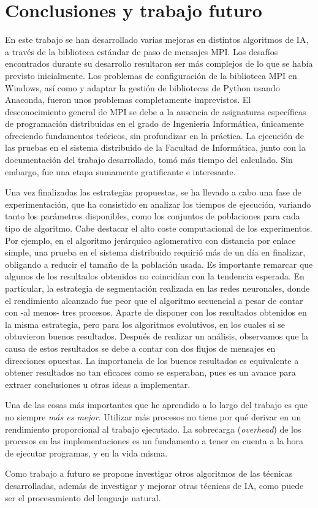 \chapter{Conclusiones y trabajo futuro}
\label{cap:c5_conclu}

	En este trabajo se han desarrollado varias mejoras en distintos algoritmos de IA, a través de la biblioteca estándar de paso de mensajes MPI. Los desafíos encontrados durante su desarrollo resultaron ser más complejos de lo que se había previsto inicialmente. Los problemas de configuración de la biblioteca MPI en Windows, así como y adaptar la gestión de bibliotecas de Python usando Anaconda, fueron unos problemas completamente imprevistos. El desconocimiento general de  MPI se debe a la ausencia de asignaturas específicas de programación distribuidas en el grado de Ingeniería Informática, únicamente ofreciendo fundamentos teóricos, sin profundizar en la práctica. La ejecución de las pruebas en el sistema distribuido de la Facultad de Informática, junto con la documentación del trabajo desarrollado, tomó más tiempo del calculado. Sin embargo, fue una etapa sumamente gratificante e interesante. 
	
		
	Una vez finalizadas las estrategias propuestas, se ha llevado a cabo una fase de experimentación, que ha consistido en analizar los tiempos de ejecución, variando tanto los parámetros disponibles, como los conjuntos de poblaciones para cada tipo de algoritmo. Cabe destacar el alto coste computacional de los experimentos. Por ejemplo, en el algoritmo jerárquico aglomerativo con distancia por enlace simple, una prueba en el sistema  distribuido requirió más de un día en finalizar, obligando a reducir el tamaño de la población usada. Es importante remarcar que algunos de los resultados obtenidos no coincidían con la tendencia esperada. En particular, la estrategia de segmentación realizada en las redes neuronales, donde el rendimiento alcanzado fue peor que el algoritmo secuencial a pesar de contar con -al menos- tres procesos. Aparte de disponer con los resultados obtenidos en la misma estrategia, pero para los algoritmos evolutivos, en los cuales si se obtuvieron buenos resultados. Después de realizar un análisis, observamos que la causa de estos resultados se debe a contar con dos flujos de mensajes en direcciones opuestas. La importancia de los buenos resultados es equivalente a obtener resultados no tan eficaces como se esperaban, pues es un avance para extraer conclusiones u otras ideas a implementar.
	

	Una de las cosas más importantes que he aprendido a lo largo del trabajo es que no siempre \textit{más es mejor}. Utilizar más procesos no tiene por qué derivar en un rendimiento proporcional al trabajo ejecutado. La sobrecarga (\textit{overhead}) de los procesos en las implementaciones es un fundamento a tener en cuenta a la hora de ejecutar programas, y en la vida misma.	
	
	
	Como trabajo a futuro se propone investigar otros algoritmos de las técnicas desarrolladas, además de investigar y mejorar otras técnicas de IA, como puede ser el procesamiento del lenguaje natural.
	
	
	
	
	